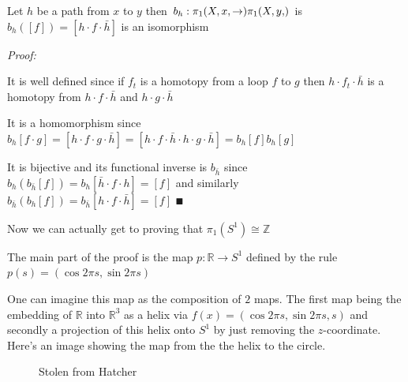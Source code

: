 \documentclass[paper=a4,fontsize=paper,12.5pt]{book}
\newcommand{\3}{\vspace*{3mm}}
\newcommand{\Proof}{\textit{Proof:}}
\newcommand{\Fund}[2]{{\pi}_{1}(#1,#2)}
\newcommand{\fund}[1]{{\pi}_{1}(#1)}
\newcommand{\Z}{\mathbb{Z}}
\newcommand{\R}{\mathbb{R}}
\newcommand{\C}[1]{{S}^{#1}}
\begin{document}
\3

\begin{lemma}

Let $h$ be a path from $x$ to $y$ then ${b}_{h}: \Fund{X,x} \to \Fund{X,y}$ is ${b}_{h}([f]) = [h \cdot f \cdot \bar{h}]$ is an isomorphism 


\end{lemma}

\Proof

It is well defined since if ${f}_{t}$ is a homotopy from a loop $f$ to $g$ then $h \cdot {f}_{t} \cdot \bar{h}$ is a homotopy from $h \cdot f \cdot \bar{h}$ and $h \cdot g \cdot \bar{h}$

\3

It is a homomorphism since ${b}_{h}[f \cdot g] = [h \cdot f \cdot g \cdot \bar{h}] = [ h \cdot f \cdot \bar{h} \cdot h \cdot g \cdot \bar{h}] = {b}_{h}[f]{b}_{h}[g]$

\3

It is bijective and its functional inverse is ${b}_{\bar{h}}$ since ${b}_{h}({b}_{\bar{h}}[f]) = {b}_{h}[\bar{h} \cdot f \cdot h] = [f]$ and similarly ${b}_{\bar{h}}({b}_{h}[f]) = {b}_{\bar{h}}[h \cdot f \cdot \bar{h}] = [f]$ $\QED$


\newpage


Now we can actually get to proving that $\fund{\C{1}} \cong \Z$

\3

The main part of the proof is the map $p: \R \to \C{1}$ defined by the rule $p(s) = (\cos 2\pi s, \sin 2\pi s)$

\3

One can imagine this map as the composition of $2$ maps. The first map being the embedding of $\R$ into ${\mathbb{R}}^{3}$ as a helix via $f(x) = (\cos 2\pi s, \sin 2\pi s,s)$ and secondly a projection of this helix onto $\C{1}$ by just removing the $z$-coordinate. Here's an image showing the map from the the helix to the circle. 

\3

{
 \begin{figure}[!hbt]
 \begin{center}
 \begin{minipage}{0.85\textwidth}
 \caption{\label{helix}\small{Stolen from Hatcher}}
 \end{minipage}
 \end{center}
 \end{figure}
 }
\end{document}
